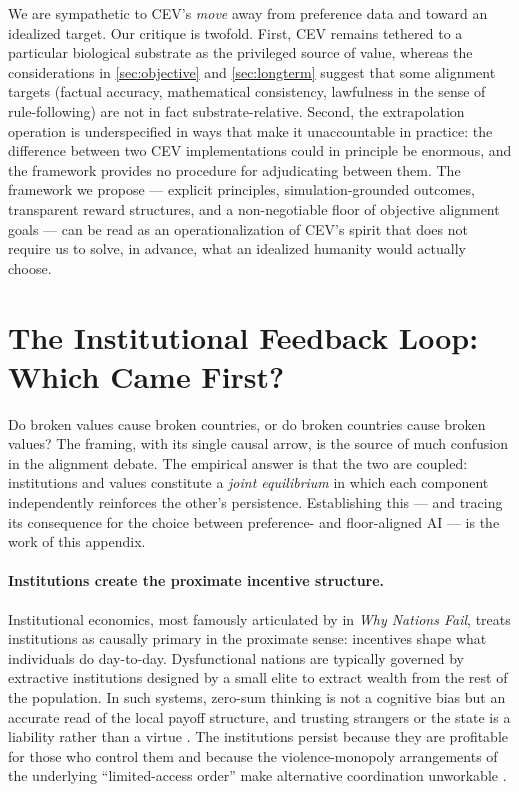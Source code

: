 \documentclass{article}
\theoremstyle{plain}
\theoremstyle{definition}
\theoremstyle{remark}
\begin{document}
We are sympathetic to CEV's \emph{move} away from preference data and toward an idealized target. Our critique is twofold. First, CEV remains tethered to a particular biological substrate as the privileged source of value, whereas the considerations in \cref{sec:objective} and \cref{sec:longterm} suggest that some alignment targets (factual accuracy, mathematical consistency, lawfulness in the sense of rule-following) are not in fact substrate-relative. Second, the extrapolation operation is underspecified in ways that make it unaccountable in practice: the difference between two CEV implementations could in principle be enormous, and the framework provides no procedure for adjudicating between them. The framework we propose --- explicit principles, simulation-grounded outcomes, transparent reward structures, and a non-negotiable floor of objective alignment goals --- can be read as an operationalization of CEV's spirit that does not require us to solve, in advance, what an idealized humanity would actually choose.




\newpage
\appendix
\onecolumn
\section{The Institutional Feedback Loop: Which Came First?}
\label{app:institutions}

Do broken values cause broken countries, or do broken countries cause broken values? The framing, with its single causal arrow, is the source of much confusion in the alignment debate. The empirical answer is that the two are coupled: institutions and values constitute a \emph{joint equilibrium} in which each component independently reinforces the other's persistence. Establishing this --- and tracing its consequence for the choice between preference- and floor-aligned AI --- is the work of this appendix.

\paragraph{Institutions create the proximate incentive structure.} Institutional economics, most famously articulated by \citet{acemoglu2012why} in \emph{Why Nations Fail}, treats institutions as causally primary in the proximate sense: incentives shape what individuals do day-to-day. Dysfunctional nations are typically governed by extractive institutions designed by a small elite to extract wealth from the rest of the population. In such systems, zero-sum thinking is not a cognitive bias but an accurate read of the local payoff structure, and trusting strangers or the state is a liability rather than a virtue \citep{north1990institutions, tabellini2010culture}. The institutions persist because they are profitable for those who control them and because the violence-monopoly arrangements of the underlying ``limited-access order'' make alternative coordination unworkable \citep{northwallisweingast2009}.
\end{document}

